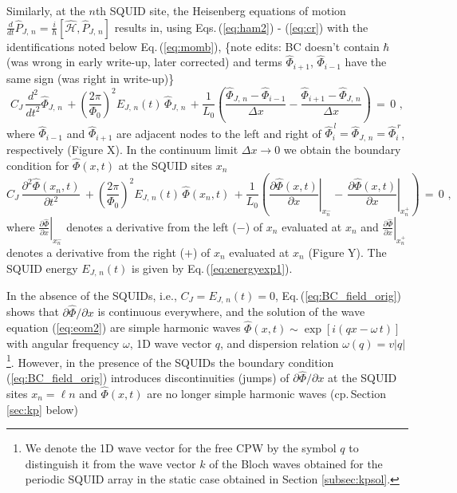 Similarly, at the $n$th SQUID site, the Heisenberg equations of motion
$\displaystyle \frac{d}{dt} \hat{P}_{J,\,n} = \frac{i}{\hbar} \left[\hat{\mathcal{H}}, \hat{P}_{J,\,n} \right]$ 
results in, using Eqs.\,(\ref{eq:ham2}) - (\ref{eq:cr}) with the identifications noted below
Eq.\,(\ref{eq:momb}), 
\color{red} \{note edits: BC doesn't contain $\hbar$ (was wrong in early write-up, later corrected) and 
terms $\hat{\Phi}_{i+1}$, $\hat{\Phi}_{i-1}$ have the same sign (was right in write-up)\}
\color{black}
%
\begin{equation}\label{eq:BC_discrete}
C_{J} \, \frac{d^2}{dt^2} \hat{\Phi}_{J,\,n} \, + \left(\frac{2 \pi}{\Phi_{0}} \right)^{2} E_{J,\,n}(t) \, \hat{\Phi}_{J, \, n}
\, + \frac{1}{L_{0}} 
\left( \frac{\hat{\Phi}_{J,\,n} - \hat{\Phi}_{i-1}}{\Delta x} - \frac{\hat{\Phi}_{i+1} - \hat{\Phi}_{J,\,n}}{\Delta x} \right)
\, = \, 0 \, \, ,
\end{equation}
%
where $\hat{\Phi}_{i-1}$ and $\hat{\Phi}_{i+1}$ are adjacent nodes to the left and right of 
$\hat{\Phi}_i^{\,l} = \hat{\Phi}_{J,\,n} = \hat{\Phi}_i^{\,r}$, respectively
\color{red}
(Figure X). 
\color{black}
In the continuum limit $\Delta x \to 0$ we obtain the boundary condition for $\hat{\Phi}(x, t)$ 
at the SQUID sites $x_n$
%
\begin{equation}\label{eq:BC_field_orig}
C_{J} \, \frac{\partial^2 \hat{\Phi}(x_n, t)}{\partial t^2} \, + 
\left(\frac{2 \pi}{\Phi_{0}}\right)^{2} E_{J,\,n}(t) \, \hat{\Phi}(x_n, t) \, + 
\frac{1}{L_{0}}\left(\left.\frac{\partial \hat{\Phi}(x, t)}{\partial x}\right|_{x_n^{-}}
- \, \left.\frac{\partial \hat{\Phi}(x,t)}{\partial x}\right|_{x_n^{+}}\right) \, = \, 0 \, \, ,
\end{equation}
%
where $\displaystyle \left.\frac{\partial \hat{\Phi}}{\partial x}\right|_{x_n^{-}}$
denotes a derivative from the left ($-$) of $x_n$ evaluated at $x_n$ and
$\displaystyle \left.\frac{\partial \hat{\Phi}}{\partial x}\right|_{x_n^{+}}$
denotes a derivative from the right ($+$) of $x_n$ evaluated at $x_n$
\color{red}
(Figure Y). 
\color{black}
The SQUID energy $E_{J,\,n}(t)$ is given by Eq.\,(\ref{eq:energyexp1}). 

In the absence of the SQUIDs, i.e., $C_J = E_{J,\,n}(t) = 0$, 
Eq.\,(\ref{eq:BC_field_orig}) shows that $\partial \hat{\Phi} / \partial x$ is 
continuous everywhere, and the solution of the wave equation (\ref{eq:eom2})
are simple harmonic waves $\hat{\Phi}(x,t) \sim \exp\left[i (q x - \omega \, t) \right]$
with angular frequency $\omega$, 1D wave vector $q$, and dispersion relation 
$\omega(q) = v |q|$
\footnote{We denote the 1D wave vector for the free CPW by the symbol $q$ to distinguish it 
from the wave vector $k$ of the Bloch waves obtained for the periodic SQUID array in the static case
obtained in Section \ref{subsec:kpsol}.}.
However, in the presence of the SQUIDs the boundary condition  
(\ref{eq:BC_field_orig}) introduces discontinuities (jumps) of $\partial \hat{\Phi} / \partial x$ 
at the SQUID sites $x_n = \ell n$ and $\hat{\Phi}(x,t)$ are no longer simple harmonic waves
(cp.\,Section \ref{sec:kp} below) 

